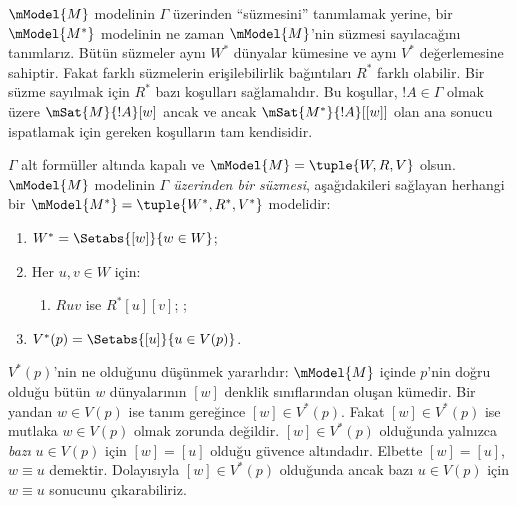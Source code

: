 



$\mModel{M}$ modelinin $\Gamma$ üzerinden ``süzmesini'' tanımlamak yerine,
bir $\mModel{M^*}$ modelinin ne zaman $\mModel{M}$'nin süzmesi sayılacağını
tanımlarız. Bütün süzmeler aynı $W^*$ dünyalar kümesine ve aynı $V^*$
değerlemesine sahiptir. Fakat farklı süzmelerin erişilebilirlik bağıntıları
$R^*$ farklı olabilir. Bir süzme sayılmak için $R^*$ bazı koşulları
sağlamalıdır. Bu koşullar, $!A\in\Gamma$ olmak üzere
$\mSat{M}{!A}[w]$ ancak ve ancak $\mSat{M^*}{!A}[{[w]}]$ olan ana sonucu
ispatlamak için gereken koşulların tam kendisidir.

\begin{defn}
  $\Gamma$ alt formüller altında kapalı ve
  $\mModel{M}=\tuple{W,R,V}$ olsun. $\mModel{M}$ modelinin
  \emph{$\Gamma$ üzerinden bir süzmesi}, aşağıdakileri sağlayan herhangi bir
  $\mModel{M^*}=\tuple{W^*,R^*,V^*}$ modelidir:
  \begin{enumerate}
  \item $W^*=\Setabs{[w]}{w\in W}$;
  \item {}%
    Her $u,v\in W$ için:
    \begin{enumerate}
    \item {}%
      $Ruv$ ise $R^*[u][v]$;
    ;
    \end{enumerate}
  \item $V^*(p)=\Setabs{[u]}{u\in V(p)}$.
  \end{enumerate}
\end{defn}

$V^*(p)$'nin ne olduğunu düşünmek yararlıdır: $\mModel{M}$ içinde $p$'nin
doğru olduğu bütün $w$ dünyalarının $[w]$ denklik sınıflarından oluşan
kümedir. Bir yandan $w\in V(p)$ ise tanım gereğince $[w]\in V^*(p)$.
Fakat $[w]\in V^*(p)$ ise mutlaka $w\in V(p)$ olmak zorunda değildir.
$[w]\in V^*(p)$ olduğunda yalnızca \emph{bazı} $u\in V(p)$ için
$[w]=[u]$ olduğu güvence altındadır. Elbette $[w]=[u]$, $w\equiv u$
demektir. Dolayısıyla $[w]\in V^*(p)$ olduğunda ancak bazı $u\in V(p)$
için $w\equiv u$ sonucunu çıkarabiliriz.

